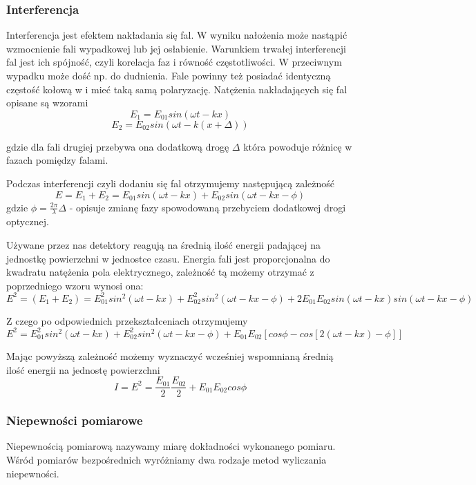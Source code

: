 \documentclass[a4paper]{article}
\newlength{\du}
\begin{document}
\subsubsection{Interferencja}

Interferencja jest efektem nakładania się fal. W wyniku nałożenia może nastąpić wzmocnienie fali wypadkowej lub jej osłabienie.  Warunkiem trwałej interferencji fal jest ich spójność, czyli korelacja faz i równość częstotliwości. W przeciwnym wypadku może dość np. do dudnienia. %
Fale powinny też posiadać identyczną częstość kołową w i mieć taką samą polaryzację.
Natężenia nakładających się fal opisane są wzorami
$$E_{1} = E_{01} sin( \omega t − kx )$$
$$E_{2} = E_{02} sin( \omega t − k ( x + \Delta ))$$

gdzie dla fali drugiej przebywa ona dodatkową drogę $\Delta$ która powoduje różnicę w fazach pomiędzy falami.

Podczas interferencji czyli dodaniu się fal otrzymujemy następującą zależność
$$E = E_{1} + E_{2} = E_{01} sin( \omega t − kx ) + E_{02} sin( \omega t − k x  − \phi )$$ gdzie $\phi =\frac{2\pi}{\lambda}\Delta$ - opisuje zmianę fazy spowodowaną przebyciem dodatkowej drogi optycznej.

Używane przez nas detektory reagują na średnią ilość energii padającej na jednostkę powierzchni w jednostce czasu. Energia fali jest proporcjonalna do kwadratu natężenia pola elektrycznego, zależność tą możemy otrzymać z poprzedniego wzoru wynosi ona:
$$E^2 = ( E_{1} + E_{2} ) = E_{01}^2 sin^2 ( \omega t − kx ) + E_{02}^2 sin^2 ( \omega t − kx − \phi ) + 2 E_{01} E_{02} sin( \omega t − kx ) sin( \omega t − kx − \phi )$$

Z czego po odpowiednich przekształceniach otrzymujemy 
$$E^2 = E_{01}^2 sin^2 (\omega t − kx ) + E_{02}^2 sin^2 ( \omega t − kx − \phi ) + E_{01} E_{02} [cos \phi − cos[ 2 ( \omega t − kx ) − \phi ]]$$

Mając powyższą zależność możemy wyznaczyć wcześniej wspomnianą średnią ilość energii na jednostę powierzchni
$$I = E^2 =\frac{E_{01}}{2} \frac{E_{02}}{2} + E_{01}E_{02} cos \phi$$
\subsubsection{Niepewności pomiarowe}

Niepewnością pomiarową nazywamy miarę dokładności wykonanego pomiaru.
Wśród pomiarów bezpośrednich wyróżniamy dwa rodzaje metod wyliczania niepewności.
\end{document}
